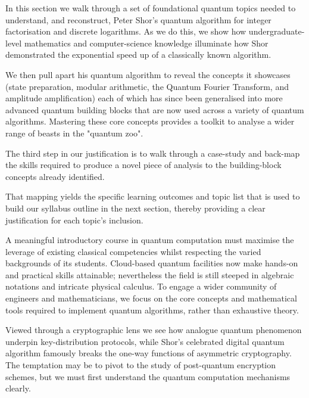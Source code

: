 In this section we walk through a set of foundational quantum topics needed to understand, 
and reconstruct, Peter Shor's quantum algorithm for integer factorisation and discrete logarithms.
As we do this, we show how undergraduate-level mathematics and computer-science knowledge 
illuminate how Shor demonstrated the exponential speed up of a classically known algorithm.

We then pull apart his quantum algorithm to reveal the concepts it showcases 
(state preparation, modular arithmetic, the Quantum Fourier Transform, and amplitude amplification) 
each of which has since been generalised into more advanced quantum building blocks that are now used 
across a variety of quantum algorithms.  
Mastering these core concepts provides a toolkit to analyse 
a wider range of beasts in the "quantum zoo"\cite{Jordan:2024}.

The third step in our justification is to walk through a case-study
and back-map the skills required to produce a novel piece of analysis 
to the building-block concepts already identified.

That mapping yields the specific learning outcomes and topic list that is used 
to build our syllabus outline in the next section, thereby providing a clear justification for each topic's inclusion.


A meaningful introductory course in quantum computation must maximise the leverage of 
existing classical competencies whilst respecting the varied backgrounds of its students.  
Cloud-based quantum facilities now make hands-on and practical skills attainable; 
nevertheless the field is still steeped in algebraic notations and intricate physical calculus. 
To engage a wider community of engineers and mathematicians,
we focus on the core concepts and mathematical tools required to implement quantum algorithms,
rather than exhaustive theory.

Viewed through a cryptographic lens we see how analogue quantum phenomenon underpin key-distribution protocols,
while Shor's celebrated digital quantum algorithm famously breaks the one-way functions of asymmetric cryptography.
The temptation may be to pivot to the study of post-quantum encryption schemes, 
but we must first understand the quantum computation mechanisms clearly.  

